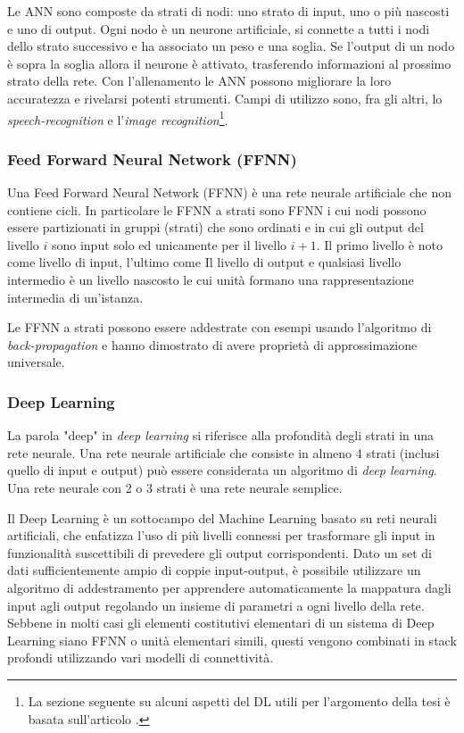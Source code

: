 \par Le ANN sono composte da strati di nodi: uno strato di input, uno o più nascosti e uno di output. Ogni nodo è un neurone artificiale, si connette a tutti i nodi dello strato successivo e ha associato un peso e una soglia. Se l'output di un nodo è sopra la soglia allora il neurone è attivato, trasferendo informazioni al prossimo strato della rete. Con l'allenamento le ANN possono migliorare la loro accuratezza e rivelarsi potenti strumenti. Campi di utilizzo sono, fra gli altri, lo \textit{speech-recognition} e l'\textit{image recognition}\footnote{La sezione seguente su alcuni aspetti del DL utili per l'argomento della tesi è basata sull'articolo .}.

\subsubsection{Feed Forward Neural Network (FFNN)}

Una Feed Forward Neural Network (FFNN) è una rete neurale artificiale che non contiene cicli. In particolare le FFNN a strati sono FFNN i cui nodi possono essere partizionati in gruppi (strati) che sono ordinati e in cui gli output del livello $i$ sono input solo ed unicamente per il livello $i+1$. Il primo livello è noto come livello di input, l'ultimo come Il livello di output e qualsiasi livello intermedio è un livello nascosto le cui unità formano una rappresentazione intermedia di un'istanza. 

\par Le FFNN a strati possono essere addestrate con esempi usando l'algoritmo di \textit{back-propagation} e hanno dimostrato di avere proprietà di approssimazione universale. 

\subsubsection{Deep Learning}

La parola "deep" in \textit{deep learning} si riferisce alla profondità degli strati in una rete neurale. Una rete neurale artificiale che consiste in almeno 4 strati (inclusi quello di input e output) può essere considerata un algoritmo di \textit{deep learning}\supercite{neuralNetworksIBM}. Una rete neurale con 2 o 3 strati è una rete neurale semplice.

Il Deep Learning è un sottocampo del Machine Learning basato su reti neurali artificiali, che enfatizza l'uso di più livelli connessi per trasformare gli input in funzionalità suscettibili di prevedere gli output corrispondenti. Dato un set di dati sufficientemente ampio di coppie input-output, è possibile utilizzare un algoritmo di addestramento per apprendere automaticamente la mappatura dagli input agli output regolando un insieme di parametri a ogni livello della rete. Sebbene in molti casi gli elementi costitutivi elementari di un sistema di Deep Learning siano FFNN o unità elementari simili, questi vengono combinati in stack profondi utilizzando vari modelli di connettività. 

